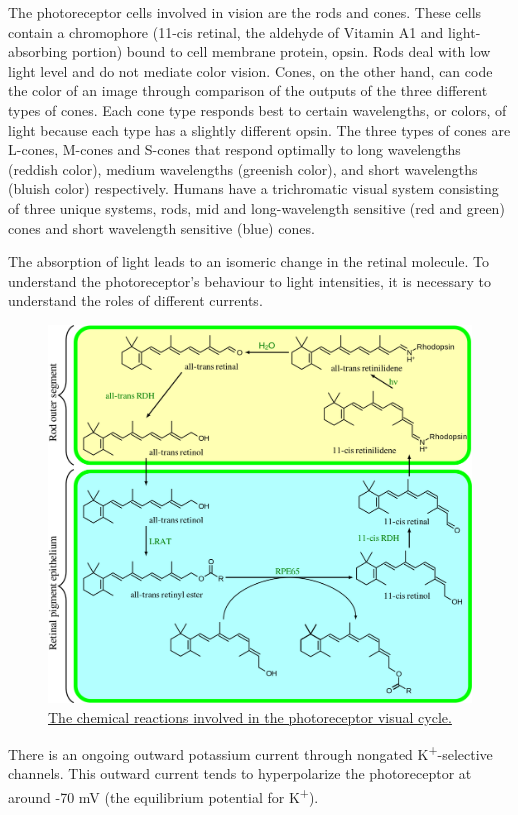 The photoreceptor cells involved in vision are the rods and cones. These cells contain a chromophore (11-cis retinal, the aldehyde of Vitamin A1 and light-absorbing portion) bound to cell membrane protein, opsin. Rods deal with low light level and do not mediate color vision. Cones, on the other hand, can code the color of an image through comparison of the outputs of the three different types of cones. Each cone type responds best to certain wavelengths, or colors, of light because each type has a slightly different opsin. The three types of cones are L-cones, M-cones and S-cones that respond optimally to long wavelengths (reddish color), medium wavelengths (greenish color), and short wavelengths (bluish color) respectively. Humans have a trichromatic visual system consisting of three unique systems, rods, mid and long-wavelength sensitive (red and green) cones and short wavelength sensitive (blue) cones.

The absorption of light leads to an isomeric change in the retinal molecule.
To understand the photoreceptor's behaviour to light intensities, it is necessary to understand the roles of different currents.



\begin{figure}

{\centering \includegraphics[width=0.7\linewidth]{./figures/visual/Visual_cycle} 

}

\caption{\href{https://commons.wikimedia.org/wiki/File:Visual_cycle.svg}{The chemical reactions involved in the photoreceptor visual cycle.}}\label{fig:absorption}
\end{figure}

There is an ongoing outward potassium current through nongated K\textsuperscript{+}-selective channels. This outward current tends to hyperpolarize the photoreceptor at around -70 mV (the equilibrium potential for K\textsuperscript{+}).

